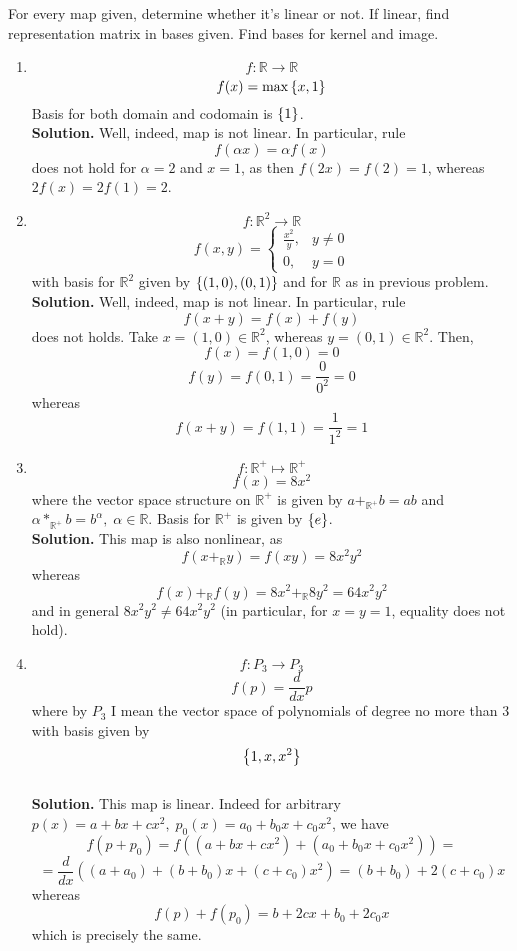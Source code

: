 \documentclass[12pt]{article} %
\title{}
\begin{document}
\maketitle
For every map given, determine whether it's linear or not. If linear, find representation matrix in bases given. Find bases for kernel and
image.
\begin{enumerate}
\item \[f:\mathbb{R}\to\mathbb{R}\]
	\[f(x)=\max\mycbra{x,1}\]
Basis for both domain and codomain is $\left\{1\right\}$.
\\\textbf{Solution.} Well, indeed, map is not linear. In particular, rule 
\[f(\alpha x)=\alpha f(x)\]
does not hold for $\alpha=2$ and $x=1$, as then $f(2x)=f(2)=1$, whereas $2f(x)=2f(1)=2$.
\item \[f:\mathbb{R}^2\to\mathbb{R}\]
	\[f(x,y)=\left\{\begin{array}{ll}
		\frac{x^2}{y},&y\neq0\\
		0,&y=0
	\end{array}\right.\]
	with basis for $\mathbb{R}^2$ given by $\left\{(1,0),(0,1)\right\}$ and for $\mathbb{R}$ as in previous problem.
\\\textbf{Solution.} Well, indeed, map is not linear. In particular, rule 
\[f(x+y)=f(x)+f(y)\]
does not holds. Take $x=(1,0)\in\mathbb{R}^2$, whereas $y=(0,1)\in\mathbb{R}^2$. Then, 
\[f(x)=f(1,0)=0\]
\[f(y)=f(0,1)=\frac{0}{0^2}=0\]
whereas
\[f(x+y)=f(1,1)=\frac{1}{1^2}=1\]
\item \[f:\mathbb{R}^+\mapsto\mathbb{R}^+\]
	\[f(x)=8x^2\]
	where the vector space structure on $\mathbb{R}^+$ is given by $a+_{\mathbb{R}^+}b=ab$ and $\alpha*_{\mathbb{R}^+}b=b^{\alpha},\;\alpha
	\in\mathbb{R}$. Basis for $\mathbb{R}^+$ is given by $\left\{e\right\}$.
	\\\textbf{Solution.} 
	This map is also nonlinear, as 
	\[f(x+_{\mathbb{R}}y)=f(xy)=8x^2y^2\]
	whereas
	\[f(x)+_{\mathbb{R}}f(y)=8x^2+_{\mathbb{R}}8y^2=64x^2y^2\]
	and in general $8x^2y^2\neq64x^2y^2$ (in particular, for $x=y=1$, equality does not hold).
\item \[f:P_3\to P_3\]
	\[f(p)=\frac{d}{dx}p\]
	where by $P_3$ I mean the vector space of polynomials of degree no more than 3 with basis given by
	\[\left\{1,x,x^2\right\}\]
	\\\textbf{Solution.} 
	This map is linear. Indeed for arbitrary $p(x)=a+bx+cx^2,\;p_0(x)=a_0+b_0x+c_0x^2$, we have
	\[f(p+p_0)=f((a+bx+cx^2)+(a_0+b_0x+c_0x^2))=\]\[=\frac{d}{dx}((a+a_0)+(b+b_0)x+(c+c_0)x^2)=(b+b_0)+2(c+c_0)x\]
	whereas
	\[f(p)+f(p_0)=b+2cx+b_0+2c_0x\]
	which is precisely the same.

\end{enumerate}
\end{document}
